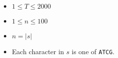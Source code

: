 \begin{itemize}
\tightlist
\item $1 \leq T \leq 2000$
\item $1 \leq n \leq 100$
\item $n = |s|$
\item Each character in $s$ is one of \texttt{ATCG}.
\end{itemize}
